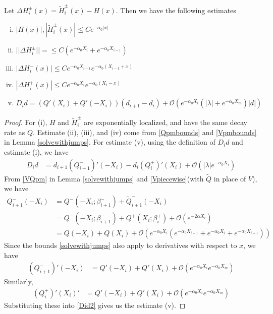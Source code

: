 \documentclass[thesis.tex]{subfiles}
\begin{document}
\begin{lemma}\label{stabestimates}
Let $\Delta H_i^\pm(x) = \tilde{H}_i^\pm(x) - H(x)$. Then we have the following estimates
\begin{enumerate}[(i)]
\item $|H(x)|, |\tilde{H}_i^\pm(x)| \leq C e^{-\alpha_0 |x|}$
\item $||\Delta H_i^\pm|| = \leq C(e^{-\alpha_0 X_i} + e^{-\alpha_0 X_{i-1}} )$ 
\item $|\Delta H_i^-(x)| \leq C e^{-\alpha_0 X_{i-1}} e^{-\alpha_0(X_{i-1} + x) }$
\item $|\Delta H_i^+(x)| \leq C e^{-\alpha_0 X_i} e^{-\alpha_0(X_i - x) }$
\item $D_i d = ( Q'(X_i) + Q'(-X_i))(d_{i+1} - d_i ) + \mathcal{O} \left( e^{-\alpha_0 X_i} \left( |\lambda| +  e^{-\alpha_0 X_m}  \right) |d| \right)$
\end{enumerate}
\begin{proof}
For (i), $H$ and $\tilde{H}_i^\pm$ are exponentially localized, and have the same decay rate as $Q$. Estimate (ii), (iii), and (iv) come from \eqref{Qpmbounds} and \eqref{Vpmbounds} in Lemma \ref{solvewithjumps}. For estimate (v), using the definition of $D_i d$ and estimate (i), we have
\begin{align}\label{Did2}
D_i d &= d_{i+1}(Q_{i+1}^-)'(-X_i) - d_i (Q_i^+)'(X_i) + \mathcal{O}(|\lambda| e^{-\alpha_0 X_i}) 
\end{align}
From \eqref{VQpm} in Lemma \ref{solvewithjumps} and \eqref{Vpiecewise}(with $\tilde{Q}$ in place of $V$), we have
\begin{align*}
Q_{i+1}^-(-X_i) &= Q^-(-X_i; \beta_{i+1}^-) + \tilde{Q}_{i+1}^-(-X_i) \\
&= Q^-(-X_i; \beta_{i+1}^-) + Q^+(X_i; \beta_i^+) + \mathcal{O}(e^{-2 \alpha X_i}) \\
&= Q(-X_i) + Q(X_i) 
+ \mathcal{O}(e^{-\alpha_0 X_i}(e^{-\alpha_0 X_{i-1}}+e^{-\alpha_0 X_i}+e^{-\alpha_0 X_{i+1}}))
\end{align*}
Since the bounds \ref{solvewithjumps} also apply to derivatives with respect to $x$, we have
\begin{align*}
(Q_{i+1}^-)'(-X_i) &= Q'(-X_i) + Q'(X_i) + \mathcal{O}(e^{-\alpha_0 X_i}e^{-\alpha_0 X_m})
\end{align*}
Similarly,
\begin{align*}
(Q_i^+)'(X_i)' &= Q'(-X_i) + Q'(X_i) + \mathcal{O}(e^{-\alpha_0 X_i}e^{-\alpha_0 X_m})
\end{align*}
Substituting these into \eqref{Did2} gives us the estimate (v).
\end{proof}
\end{lemma}
\end{document}
